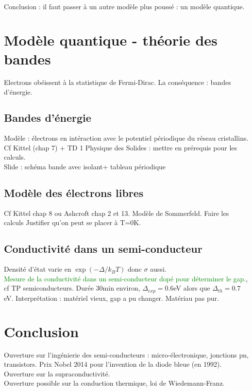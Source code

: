 Conclusion : il faut passer à un autre modèle plus poussé : un modèle quantique.

\section{Modèle quantique - théorie des bandes}
Electrons obéissent à la statistique de Fermi-Dirac. La conséquence : bandes d'énergie.
\subsection{Bandes d'énergie}
Modèle : électrons en intéraction avec le potentiel périodique du réseau cristallins.\\
Cf Kittel (chap 7) + TD 1 Physique des Solides : mettre en prérequis pour les calculs.\\
Slide : schéma bande avec isolant+ tableau périodique 

\subsection{Modèle des électrons libres}
Cf Kittel chap 8 ou Ashcroft chap 2 et 13. Modèle de Sommerfeld. Faire les calculs Justifier qu'on peut se placer à T=0K.
\subsection{Conductivité dans un semi-conducteur}
Densité d'état varie en $\exp(-\Delta/k_BT)$ donc $\sigma$ aussi.\\
\textcolor{green}{Mesure de la conductivité dans un semi-conducteur dopé pour déterminer le gap.}, cf TP semiconducteurs. Durée 30min environ, $\Delta_{exp}=0.6$eV alors que $\Delta_{th}=0.7$eV. Interprétation : matériel vieux, gap a pu changer. Matériau pas pur.\\
\section{Conclusion}
Ouverture sur l'ingénierie des semi-conducteurs : micro-électronique, jonctions pn, transistors. Prix Nobel 2014 pour l'invention de la diode bleue (en 1992).\\
Ouverture sur la supraconductivité.\\
Ouverture possible sur la conduction thermique, loi de Wiedemann-Franz.